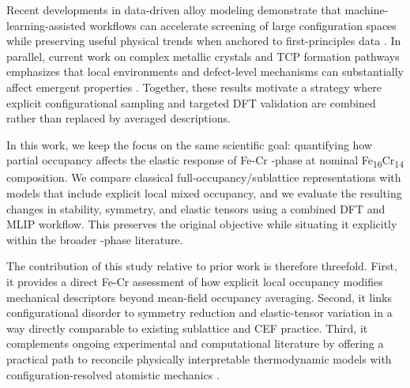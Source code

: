 \documentclass[superscriptaddress, 12pt]{revtex4-2}%
\begin{document}
Recent developments in data-driven alloy modeling demonstrate that machine-learning-assisted workflows can accelerate screening of large configuration spaces while preserving useful physical trends when anchored to first-principles data \cite{lit_2022_06_vazquez_acta_materialia,lit_2025_11_zhang_acta_materialia,lit_2025_01_bijjala_acta_materialia}.
In parallel, current work on complex metallic crystals and TCP formation pathways emphasizes that local environments and defect-level mechanisms can substantially affect emergent properties \cite{lit_2022_04_kishida_acta_materialia,lit_2022_12_turner_nature_communications,lit_2024_08_bai_acta_materialia}.
Together, these results motivate a strategy where explicit configurational sampling and targeted DFT validation are combined rather than replaced by averaged descriptions.

In this work, we keep the focus on the same scientific goal: quantifying how partial occupancy affects the elastic response of Fe-Cr \textsigma-phase at nominal Fe\textsubscript{16}Cr\textsubscript{14} composition.
We compare classical full-occupancy/sublattice representations with models that include explicit local mixed occupancy, and we evaluate the resulting changes in stability, symmetry, and elastic tensors using a combined DFT and MLIP workflow.
This preserves the original objective while situating it explicitly within the broader \textsigma-phase literature.

The contribution of this study relative to prior work is therefore threefold.
First, it provides a direct Fe-Cr \textsigma assessment of how explicit local occupancy modifies mechanical descriptors beyond mean-field occupancy averaging.
Second, it links configurational disorder to symmetry reduction and elastic-tensor variation in a way directly comparable to existing sublattice and CEF practice.
Third, it complements ongoing experimental and computational \textsigma literature by offering a practical path to reconcile physically interpretable thermodynamic models with configuration-resolved atomistic mechanics \cite{lit_2008_03_joubert_progress_in_materials_science,lit_2012_09_kabliman_applied_sciences,lit_2023_05_kishida_acta_materialia,lit_2023_12_hallstedt_calphad,lit_2025_11_zhang_acta_materialia}.
\end{document}
